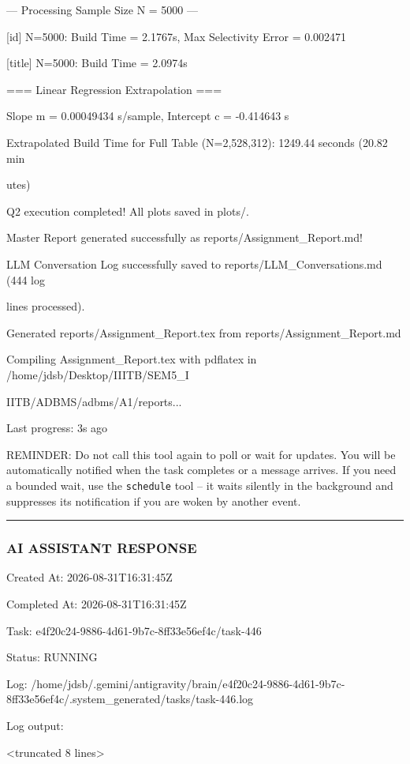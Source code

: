 \documentclass[11pt,a4paper]{article}
\begin{document}
--- Processing Sample Size N = 5000 ---

[id] N=5000: Build Time = 2.1767s, Max Selectivity Error = 0.002471

[title] N=5000: Build Time = 2.0974s

=== Linear Regression Extrapolation ===

Slope m = 0.00049434 s/sample, Intercept c = -0.414643 s

Extrapolated Build Time for Full Table (N=2,528,312): 1249.44 seconds (20.82 min

utes)

Q2 execution completed! All plots saved in plots/.

Master Report generated successfully as reports/Assignment\_Report.md!

LLM Conversation Log successfully saved to reports/LLM\_Conversations.md (444 log

lines processed).

Generated reports/Assignment\_Report.tex from reports/Assignment\_Report.md

Compiling Assignment\_Report.tex with pdflatex in /home/jdsb/Desktop/IIITB/SEM5\_I

IITB/ADBMS/adbms/A1/reports...


Last progress: 3s ago



REMINDER: Do not call this tool again to poll or wait for updates. You will be automatically notified when the task completes or a message arrives. If you need a bounded wait, use the \texttt{schedule} tool -- it waits silently in the background and suppresses its notification if you are woken by another event.


\hrule

\subsubsection{AI ASSISTANT RESPONSE}

Created At: 2026-08-31T16:31:45Z

Completed At: 2026-08-31T16:31:45Z

Task: e4f20c24-9886-4d61-9b7c-8ff33e56ef4c/task-446

Status: RUNNING

Log: /home/jdsb/.gemini/antigravity/brain/e4f20c24-9886-4d61-9b7c-8ff33e56ef4c/.system\_generated/tasks/task-446.log

Log output:

<truncated 8 lines>
\end{document}
